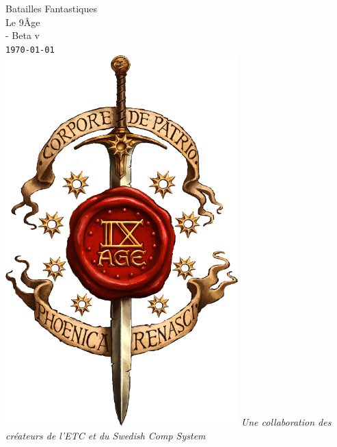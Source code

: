 
\setlength{\arrayrulewidth}{2pt}
\renewcommand{\arraystretch}{1.2}

\begin{titlepage}
\begin{center}

\ifdef{\booktitle}{}{\newcommand{\booktitle}{Missing title}}
\ifdef{\version}{}{\newcommand{\version}{Missing version}}

{\fontsize{50}{60}\selectfont Batailles Fantastiques \\ Le 9\ieme Âge} \\
\vspace{0.7cm}
{\fontsize{20}{24}\selectfont \booktitle\/ - Beta v\version} \\
\vspace{0.4cm}
{\fontsize{14}{16.8}\selectfont \texttt{\today}} \\
\vfill
\includegraphics[width=9cm]{../Formatage/logo_9th.png}
\vfill
{\fontsize{12}{14.4}\selectfont \textit{Une collaboration des créateurs de l'ETC et du Swedish Comp System}} \\



\end{center}
\end{titlepage}
